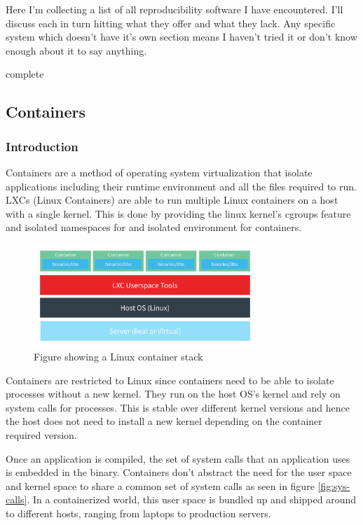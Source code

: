 \documentclass[american]{article}
\newcommand{\complete}{
	\gls{complete}
}
\begin{document}
Here I'm collecting a list of all reproducibility software I have encountered. I'll discuss each in turn hitting what they offer and what they lack. Any specific system which doesn't have it's own section means I haven't tried it or don't know enough about it to say anything.

\complete

\subsection{Containers} \label{sec:software-containers}

\subsubsection{Introduction}

Containers are a method of operating system virtualization that isolate applications including their runtime environment and all the files required to run. LXCs (Linux Containers) are able to run multiple Linux containers on a host with a single kernel. This is done by providing the linux kernel's cgroups feature and isolated namespaces for and isolated environment for containers\cite{containers-hierarchy}.

\begin{figure}[h]
    \centering
    \includegraphics[width=0.75\textwidth]{containers-intro}
    \caption{Figure showing a Linux container stack}
    \label{fig:containers-intro}
\end{figure}

Containers are restricted to Linux since containers need to be able to isolate processes without a new kernel. They run on the host OS's kernel and rely on system calls for processes. This is stable over different kernel versions and hence the host does not need to install a new kernel depending on the container required version\cite{kernel-space-redhat}.

Once an application is compiled, the set of system calls that an application uses is embedded in the binary. Containers don't abstract the need for the user space and kernel space to share a common set of system calls as seen in figure \ref{fig:sys-calls}. In a containerized world, this user space is bundled up and shipped around to different hosts, ranging from laptops to production servers.
\end{document}
